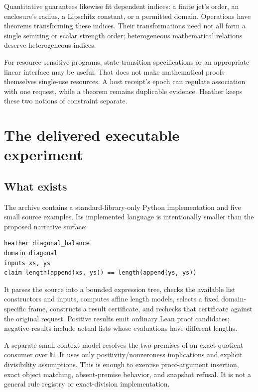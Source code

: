 \documentclass[11pt,letterpaper]{article}
\newcommand{\N}{\mathbb N}\newcommand{\Z}{\mathbb Z}\newcommand{\Q}{\mathbb Q}\newcommand{\R}{\mathbb R}
\theoremstyle{definition}\newtheorem{definition}[theorem]{Definition}
\theoremstyle{remark}\newtheorem{remark}[theorem]{Remark}
\begin{document}
Quantitative guarantees likewise fit dependent indices: a finite jet's order,
an enclosure's radius, a Lipschitz constant, or a permitted domain. Operations
have theorems transforming these indices. Their transformations need not all
form a single semiring or scalar strength order; heterogeneous mathematical
relations deserve heterogeneous indices.

For resource-sensitive programs, state-transition specifications or an
appropriate linear interface may be useful. That does not make mathematical
proofs themselves single-use resources. A host receipt's epoch can regulate
association with one request, while a theorem remains duplicable evidence.
Heather keeps these two notions of constraint separate.

\section{The delivered executable experiment}\label{sec:experiment}

\subsection{What exists}
The archive contains a standard-library-only Python implementation and five
small source examples. Its implemented language is intentionally smaller than
the proposed narrative surface:
\par\noindent\begin{minipage}{\linewidth}
\begin{lstlisting}
heather diagonal_balance
domain diagonal
inputs xs, ys
claim length(append(xs, ys)) == length(append(ys, ys))
\end{lstlisting}
\end{minipage}\par
It parses the source into a bounded expression tree, checks the available list
constructors and inputs, computes affine length models, selects a fixed
domain-specific frame, constructs a result certificate, and rechecks that
certificate against the original request. Positive results emit ordinary Lean
proof candidates; negative results include actual lists whose evaluations have
different lengths.

A separate small context model resolves the two premises of an exact-quotient
consumer over $\N$. It uses only positivity/nonzeroness implications and
explicit divisibility assumptions. This is enough to exercise proof-argument
insertion, exact object matching, absent-premise behavior, and snapshot
refusal. It is not a general rule registry or exact-division implementation.
\end{document}
